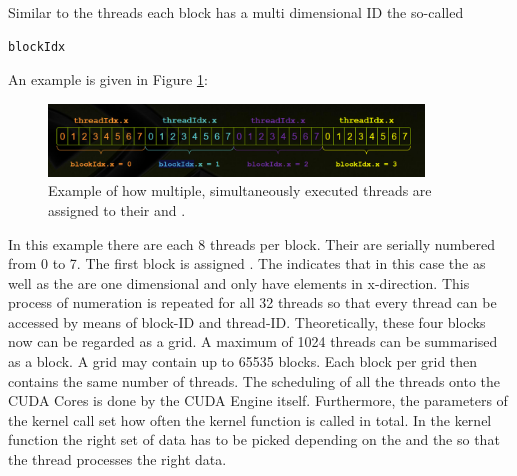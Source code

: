 Similar to the threads each block has a multi dimensional ID the so-called 
\begin{verbatim}
blockIdx
\end{verbatim}

An example is given in Figure \ref{blockidx_threadidx}:

\begin{figure}[H]
    \centering
    \includegraphics[width=0.89\textwidth]{Graphics/blockidxthreadix_explain.png}
    \caption{Example of how multiple, simultaneously executed threads are assigned to their and   \cite{cuda_indexing}.}
    \label{blockidx_threadidx}
\end{figure}

In this example there are each 8 threads per block. Their  are serially numbered from 0 to 7.
The first block is assigned . The  indicates that in this case the  as well as the  are one dimensional and only have elements in x-direction. This process of numeration is repeated for all 32 threads so that every thread can be accessed by means of block-ID and thread-ID. Theoretically, these four blocks now can be  regarded as a grid.
A maximum of 1024 threads can be summarised as a block. A grid may contain up to 65535 blocks. Each block per grid then contains the same number of threads. The scheduling of all the threads onto the CUDA Cores is done by the CUDA Engine itself.
Furthermore, the parameters of the kernel call set how often the kernel function is called in total. In the kernel function the right set of data has to be picked depending on the  and the  so that the thread processes the right data.

